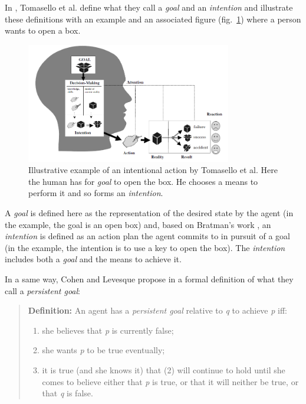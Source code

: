 \documentclass[english,a4paper,11pt,twoside]{StyleThese}
\begin{document}
In \cite{tomasello2005understanding}, Tomasello et al. define what they call a \textit{goal} and an \textit{intention} and illustrate these definitions with an example and an associated figure (fig.~\ref{fig:intention}) where a person wants to open a box.

\begin{figure}[!h]
	\centering
    \includegraphics[width=0.8\textwidth]{figs/Chapter1/intention.png}
    \caption{Illustrative example of an intentional action by Tomasello et al. Here the human has for \textit{goal} to open the box. He chooses a means to perform it and so forms an \textit{intention}.}
    \label{fig:intention}
\end{figure}

A \textit{goal} is defined here as the representation of the desired state by the agent (in the example, the goal is an open box) and, based on Bratman's work \cite{bratman1989intention}, an \textit{intention} is defined as an action plan the agent commits to in pursuit of a goal (in the example, the intention is to use a key to open the box). The \textit{intention} includes both a \textit{goal} and the means to achieve it. 

In a same way, Cohen and Levesque propose in \cite{cohen1991teamwork} a formal definition of what they call a \textit{persistent goal}:

\begin{quote}
\textbf{Definition: } An agent has a \textit{persistent goal} relative to \textit{q} to achieve \textit{p} iff:
\begin{enumerate}
\item she believes that \textit{p} is currently false;
\item she wants \textit{p} to be true eventually;
\item it is true (and she knows it) that (2) will continue to hold until she comes to believe either that \textit{p} is true, or that it will neither be true, or that \textit{q} is false.
\end{enumerate}
\end{quote}
\end{document}
